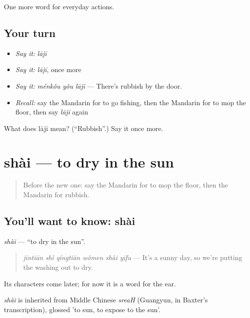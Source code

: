 \begin{grammarlens}[title={What you've built}]
One more word for everyday actions.
\end{grammarlens}

\subsection*{Your turn}
\begin{itemize}
\raggedright
  \item \emph{Say it:} \emph{lājī}
  \item \emph{Say it:} \emph{lājī}, once more
  \item \emph{Say it:} \emph{ménkǒu yǒu lājī} — There's rubbish by the door.
  \item \emph{Recall:} say the Mandarin for to go fishing, then the Mandarin for to mop the floor, then say \emph{lājī} again
\end{itemize}

\begin{tcolorbox}[breakable,colback=teal!4,colframe=teal!35!black,title={Before you move on}]
What does lājī mean? (\textquotedblleft{}Rubbish\textquotedblright{}.) Say it once more.
\end{tcolorbox}
\section[shài]{shài — to dry in the sun}

\label{lesson:ZH-C142-shai}



\begin{quote}
Before the new one: say the Mandarin for to mop the floor, then the Mandarin for rubbish.
\end{quote}

\subsection*{You'll want to know: shài}
\emph{shài} — \textquotedblleft{}to dry in the sun\textquotedblright{}.

\begin{quote}
\emph{jīntiān shì qíngtiān wǒmen shài yīfu} — It's a sunny day, so we're putting the washing out to dry.
\end{quote}

Its characters come later; for now it is a word for the ear.

\begin{cousinweb}
\emph{shài} is inherited from Middle Chinese \emph{sreaH} (Guangyun, in Baxter's transcription), glossed 'to sun, to expose to the sun'.
\end{cousinweb}

